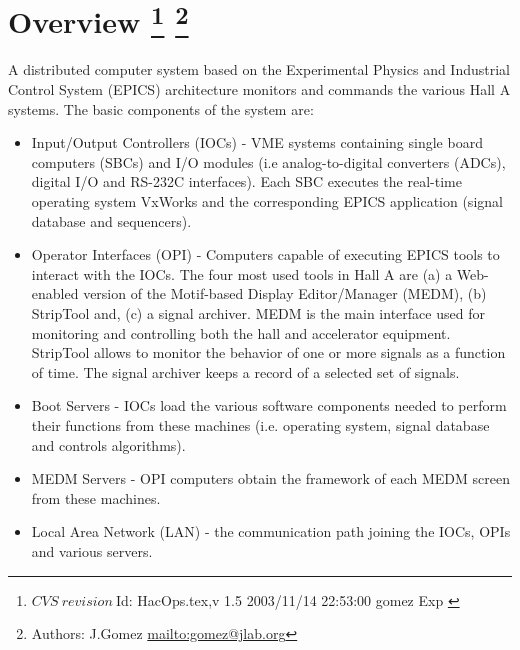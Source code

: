 \section[Overview]{Overview
\footnote{
  $CVS~revision~ $Id: HacOps.tex,v 1.5 2003/11/14 22:53:00 gomez Exp $ $
}
\footnote{Authors: J.Gomez \url{mailto:gomez@jlab.org}}
}


A distributed computer system
based on the 
Experimental Physics and Industrial Control System 
(EPICS)
 architecture monitors and commands
the various Hall A systems. The basic components of the system are:
\begin{itemize}
\item Input/Output Controllers (IOCs) - VME systems containing single
board computers (SBCs) and I/O modules
(i.e analog-to-digital converters (ADCs), digital I/O and RS-232C interfaces).
Each SBC executes the real-time operating system VxWorks and the corresponding EPICS application (signal database
and sequencers).
\item Operator Interfaces (OPI) - Computers capable of executing
EPICS tools to interact with the IOCs.
The four most used tools in Hall A are (a)
a Web-enabled version of the Motif-based Display Editor/Manager (MEDM), (b) StripTool and, (c) a signal archiver.
MEDM is the main interface used for monitoring and controlling both the hall and accelerator
equipment. StripTool allows to monitor 
the behavior of one or more signals as a function of time. 
The signal archiver keeps a record of a selected set of signals.
\item Boot Servers - IOCs load the various
software components needed to perform their functions from these machines (i.e. operating system,
signal database and controls algorithms).
\item MEDM Servers - OPI computers obtain the framework of each MEDM screen from these machines.
\item Local Area Network (LAN) - the communication path joining the IOCs, OPIs and various servers.
\end{itemize}


